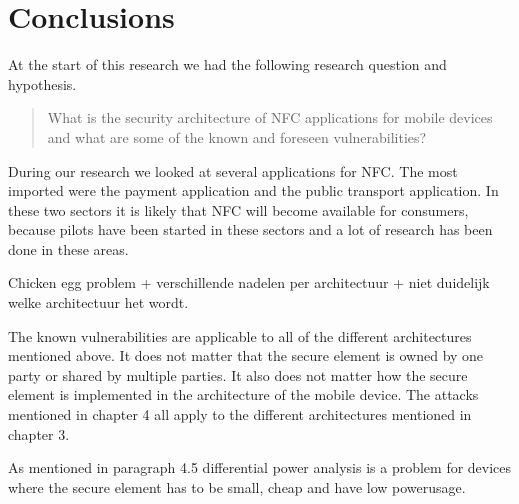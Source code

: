 \label{chap:conclusions}
\section{Conclusions}

At the start of this research we had the following research question and hypothesis. 

\begin{quote}
What is the security architecture of NFC applications for mobile devices and what are some of the known and foreseen vulnerabilities?
\end{quote}

\begin{quote}
\end{quote}

During our research we looked at several applications for NFC. The most imported were the payment application and the public transport application. In these two sectors it is likely that NFC will become available for consumers, because pilots have been started in these sectors and a lot of research has been done in these areas.

Chicken egg problem + verschillende nadelen per architectuur + niet duidelijk welke architectuur het wordt.



The known vulnerabilities are applicable to all of the different architectures mentioned above. It does not matter that the secure element is owned by one party or shared by multiple parties. It also does not matter how the secure element is implemented in the architecture of the mobile device. The attacks mentioned in chapter 4 all apply to the different architectures mentioned in chapter 3. 

As mentioned in paragraph 4.5 differential power analysis is a problem for devices where the secure element has to be small, cheap and have low powerusage.
